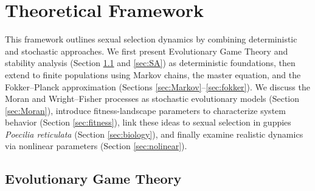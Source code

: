 \section{Theoretical Framework}

This framework outlines sexual selection dynamics by combining deterministic and stochastic approaches. We first present Evolutionary Game Theory and stability analysis (Section \ref{sec:EGT} and \ref{sec:SA}) as deterministic foundations, then extend to finite populations using Markov chains, the master equation, and the Fokker--Planck approximation (Sections \ref{sec:Markov}--\ref{sec:fokker}). We discuss the Moran and Wright--Fisher processes as stochastic evolutionary models (Section \ref{sec:Moran}), introduce fitness-landscape parameters to characterize system behavior (Section \ref{sec:fitness}), link these ideas to sexual selection in guppies \textit{Poecilia reticulata} (Section \ref{sec:biology}), and finally examine realistic dynamics via nonlinear parameters (Section \ref{sec:nolinear}).\\ 


\subsection{Evolutionary Game Theory}
\label{sec:EGT}

